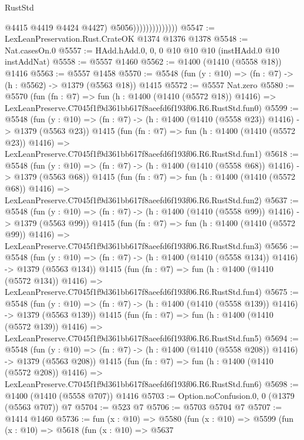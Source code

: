 \begin{lexlean}{RustStd}
\begin{coremodule}
                                  @4415
                                  @4419
                                  @4424
                                  @4427)
                                @5056))))))))))))))
@5547 := LexLeanPreservation.Rust.CrateOK @1374 @1376 @1378
@5548 := Nat.casesOn.{0}
@5557 := HAdd.hAdd.{0, 0, 0} @10 @10 @10 (instHAdd.{0} @10 instAddNat)
@5558 := @5557 @1460
@5562 := @1400 (@1410 (@5558 @18)) @1416
@5563 := @5557 @1458
@5570 := @5548 (fun (y : @10) => (fn : @7) -> (h : @5562) -> @1379 (@5563 @18)) @1415
@5572 := @5557 Nat.zero
@5580 := @5570
    (fun (fn : @7) =>
    fun (h : @1400 (@1410 (@5572 @18)) @1416) =>
    LexLeanPreserve.C7045f1f9d361bb617f8aeefd6f193f06.R6.RustStd.fun0)
@5599 := @5548
    (fun (y : @10) => (fn : @7) -> (h : @1400 (@1410 (@5558 @23)) @1416) -> @1379 (@5563 @23))
    @1415
    (fun (fn : @7) =>
    fun (h : @1400 (@1410 (@5572 @23)) @1416) =>
    LexLeanPreserve.C7045f1f9d361bb617f8aeefd6f193f06.R6.RustStd.fun1)
@5618 := @5548
    (fun (y : @10) => (fn : @7) -> (h : @1400 (@1410 (@5558 @68)) @1416) -> @1379 (@5563 @68))
    @1415
    (fun (fn : @7) =>
    fun (h : @1400 (@1410 (@5572 @68)) @1416) =>
    LexLeanPreserve.C7045f1f9d361bb617f8aeefd6f193f06.R6.RustStd.fun2)
@5637 := @5548
    (fun (y : @10) => (fn : @7) -> (h : @1400 (@1410 (@5558 @99)) @1416) -> @1379 (@5563 @99))
    @1415
    (fun (fn : @7) =>
    fun (h : @1400 (@1410 (@5572 @99)) @1416) =>
    LexLeanPreserve.C7045f1f9d361bb617f8aeefd6f193f06.R6.RustStd.fun3)
@5656 := @5548
    (fun (y : @10) => (fn : @7) -> (h : @1400 (@1410 (@5558 @134)) @1416) -> @1379 (@5563 @134))
    @1415
    (fun (fn : @7) =>
    fun (h : @1400 (@1410 (@5572 @134)) @1416) =>
    LexLeanPreserve.C7045f1f9d361bb617f8aeefd6f193f06.R6.RustStd.fun4)
@5675 := @5548
    (fun (y : @10) => (fn : @7) -> (h : @1400 (@1410 (@5558 @139)) @1416) -> @1379 (@5563 @139))
    @1415
    (fun (fn : @7) =>
    fun (h : @1400 (@1410 (@5572 @139)) @1416) =>
    LexLeanPreserve.C7045f1f9d361bb617f8aeefd6f193f06.R6.RustStd.fun5)
@5694 := @5548
    (fun (y : @10) => (fn : @7) -> (h : @1400 (@1410 (@5558 @208)) @1416) -> @1379 (@5563 @208))
    @1415
    (fun (fn : @7) =>
    fun (h : @1400 (@1410 (@5572 @208)) @1416) =>
    LexLeanPreserve.C7045f1f9d361bb617f8aeefd6f193f06.R6.RustStd.fun6)
@5698 := @1400 (@1410 (@5558 @707)) @1416
@5703 := Option.noConfusion.{0, 0} (@1379 (@5563 @707)) @7
@5704 := @523 @7
@5706 := @5703 @5704 @7
@5707 := @1414 @1460
@5736 := fun (x : @10) =>
  @5580
    (fun (x : @10) =>
    @5599
      (fun (x : @10) =>
      @5618
        (fun (x : @10) =>
        @5637

\end{coremodule}
\end{lexlean}

